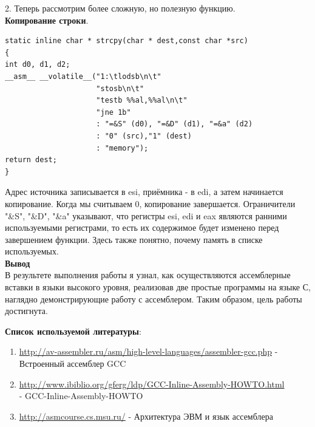 \documentclass[12pt]{article}
\begin{document}
2. Теперь рассмотрим более сложную, но полезную функцию. \\

\textbf{Копирование строки}. \\
\begin{verbatim}
static inline char * strcpy(char * dest,const char *src)
{
int d0, d1, d2;
__asm__ __volatile__("1:\tlodsb\n\t"
                     "stosb\n\t"
                     "testb %%al,%%al\n\t"
                     "jne 1b"
                     : "=&S" (d0), "=&D" (d1), "=&a" (d2)
                     : "0" (src),"1" (dest) 
                     : "memory");
return dest;
}
\end{verbatim}
 Адрес источника записывается в esi, приёмника - в edi, а затем начинается копирование. Когда мы считываем 0, копирование завершается. Ограничители "\&S", "\&D", "\&a" указывают, что регистры esi, edi и eax являются ранними используемыми регистрами, то есть их содержимое будет изменено перед завершением функции. Здесь также понятно, почему память в списке используемых.\\

\textbf{Вывод}\\

В результете выполнения работы я узнал, как осуществляются ассемблерные вставки в языки высокого уровня, реализовав две простые программы на языке С, наглядно демонстрирующие работу с ассемблером. Таким образом, цель работы достигнута.

\par\bigskip
\textbf{Список используемой литературы}:
\begin{enumerate}
\item \url{http://av-assembler.ru/asm/high-level-languages/assembler-gcc.php} - Встроенный ассемблер GCC
\item \url{http://www.ibiblio.org/gferg/ldp/GCC-Inline-Assembly-HOWTO.html} \\ - GCC-Inline-Assembly-HOWTO
\item \url{http://asmcourse.cs.msu.ru/} - Архитектура ЭВМ и язык ассемблера
\end{enumerate}
\end{document}
